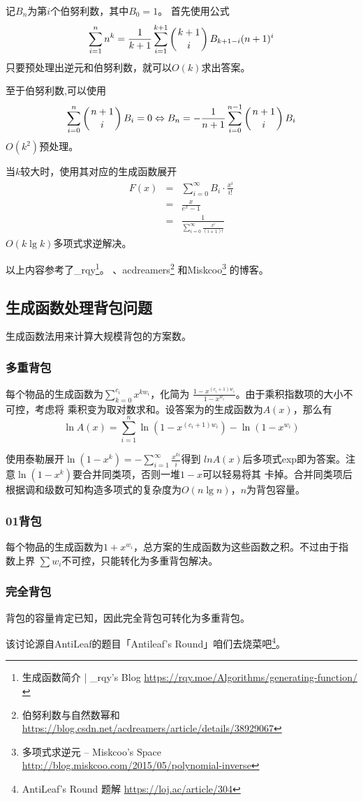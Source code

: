 记$B_n$为第$i$个伯努利数，其中$B_0=1$。
首先使用公式
\begin{displaymath}
	\sum_{i=1}^n{n^k}=\frac{1}{k+1}\sum_{i=1}^{k+1}{\left(k+1 \atop i\right)B_{k+1-i}(n+1)^i}
\end{displaymath}
只要预处理出逆元和伯努利数，就可以$O(k)$求出答案。

至于伯努利数,可以使用
\begin{displaymath}
	\sum_{i=0}^n{\left(n+1 \atop i\right)B_i}=0
	\Leftrightarrow
	B_n=-\frac{1}{n+1}\sum_{i=0}^{n-1}{\left(n+1 \atop i\right)B_i}
\end{displaymath}
$O(k^2)$预处理。

当$k$较大时，使用其对应的生成函数展开
\begin{eqnarray*}
    F(x)&=&\sum_{i=0}^\infty{B_i\cdot\frac{x^i}{i!}}\\
    &=&\frac{x}{e^x-1}\\
	&=&\frac{1}{\displaystyle \sum_{i=0}^\infty{\frac{x^i}{(i+1)!}}}
\end{eqnarray*}
$O(k\lg k)$多项式求逆解决。

以上内容参考了\_rqy\footnote{生成函数简介 | \_rqy's Blog
	\url{https://rqy.moe/Algorithms/generating-function/}
}。
、acdreamers\footnote{伯努利数与自然数幂和
	\url{https://blog.csdn.net/acdreamers/article/details/38929067}
}
和Miskcoo\footnote{多项式求逆元 – Miskcoo's Space
	\url{http://blog.miskcoo.com/2015/05/polynomial-inverse}
}
的博客。
\subsection{生成函数处理背包问题}
生成函数法用来计算大规模背包的方案数。
\subsubsection{多重背包}
每个物品的生成函数为$\displaystyle \sum_{k=0}^{c_i}{x^{kw_i}}$，化简为
$\frac{1-x^{(c_i+1)w_i}}{1-x^{w_i}}$。由于乘积指数项的大小不可控，考虑将
乘积变为取对数求和。设答案为的生成函数为$A(x)$，那么有
\begin{displaymath}
\ln A(x)=\sum_{i=1}^n{\ln(1-x^{(c_i+1)w_i})-\ln (1-x^{w_i})}
\end{displaymath}

使用泰勒展开$\displaystyle \ln(1-x^k)=-\sum_{i=1}^\infty{\frac{x^{ki}}{i}}$得到
$ln A(x)$后多项式exp即为答案。注意$\ln (1-x^k)$要合并同类项，否则一堆$1-x$可以轻易将其
卡掉。合并同类项后根据调和级数可知构造多项式的复杂度为$O(n\lg n)$，$n$为背包容量。
\subsubsection{01背包}
每个物品的生成函数为$1+x^{w_i}$，总方案的生成函数为这些函数之积。不过由于指数上界
$\sum{w_i}$不可控，只能转化为多重背包解决。
\subsubsection{完全背包}
背包的容量肯定已知，因此完全背包可转化为多重背包。

该讨论源自AntiLeaf的题目「Antileaf's Round」咱们去烧菜吧\footnote{
	AntiLeaf's Round 题解
	\url{https://loj.ac/article/304}
}。
